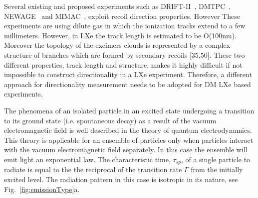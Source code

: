 Several existing and proposed experiments such as DRIFT-II~\cite{Muna:2007zz}, DMTPC~\cite{Deaconu:2017vam}, NEWAGE~\cite{Yakabe:2016pjh} and MIMAC~\cite{Riffard:2016mgw}, exploit recoil direction properties. However These experiments are using dilute gas in which the ionization tracks extend to a few millimeters. However, in LXe the track length is estimated to be O(100nm). Moreover the topology of the excimers clouds is represented by a complex structure of branches which are formed by secondary recoils [35,50]. These two different properties, track length and structure, makes it highly difficult if not impossible to construct directionality in a LXe experiment. Therefore, a different approach for directionality measurement needs to be adopted for DM LXe based experiments.

The phenomena of an isolated particle in an excited state undergoing a transition to its ground state (i.e. spontaneous decay) as a result of the vacuum electromagnetic field  is well described in the theory of quantum electrodynamics. This theory is applicable for an ensemble of particles only when particles interact with the vacuum electromagnetic field separately. In this case the ensemble will emit light an exponential law. The characteristic time, $\tau_{sp}$, of a single particle to radiate is equal to the the reciprocal of the transition rate $\Gamma$ from the initially excited level. The radiation pattern in this case is isotropic in its nature, see Fig.~\ref{fig:emissionType}a. 

